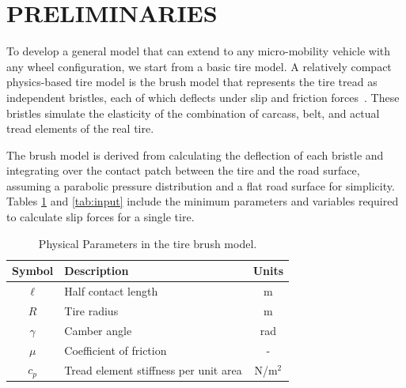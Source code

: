 \documentclass[letterpaper, 10 pt, conference]{ieeeconf}  %
\begin{document}
\section{PRELIMINARIES} 

To develop a general model that can extend to any micro-mobility vehicle with any wheel configuration, we start from a basic tire model. A relatively compact physics-based tire model is the brush model that represents the tire tread as independent bristles, each of which deflects under slip and friction forces~\cite{PACEJKA201287}. These bristles simulate the elasticity of the combination of carcass, belt, and actual tread elements of the real tire. 

The brush model is derived from calculating the deflection of each bristle and integrating over the contact patch between the tire and the road surface, assuming a parabolic pressure distribution and a flat road surface for simplicity. Tables \ref{tab:params} and \ref{tab:input} include the minimum parameters and variables required to calculate slip forces for a single tire.

\vspace{-5pt}
\begin{table}[h]
\caption{Physical Parameters in the tire brush model.}
\label{tab:params}
\vspace{-5pt}
    \centering
    \begin{tabular}{clc}
    \toprule
    \textbf{Symbol} & \textbf{Description} & \textbf{Units} \\
\midrule
        $\ell$ & Half contact length & m \\
        $R$ & Tire radius & m \\
        $\gamma$ & Camber angle & rad \\
        $\mu$ & Coefficient of friction & -\\
        $c_p$ & Tread element stiffness per unit area & N/m$^2$ \\
    \bottomrule
    \end{tabular}
    \vspace{-15pt}
\end{table}
\end{document}
